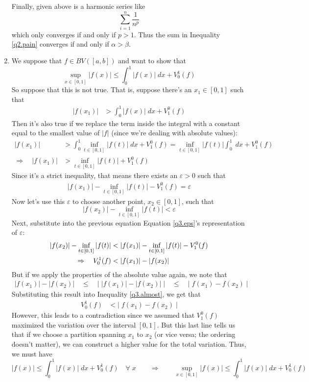 \documentclass[12pt]{article}
\theoremstyle{plain}
\theoremstyle{definition}
\theoremstyle{remark}
\begin{document}
\begin{enumerate}
Finally, given above is a harmonic series like
\[
    \sum^n_{i=1} \frac{1}{n^p}
\]
which only converges if and only if $p>1$. Thus the sum in Inequality \ref{q2.pain} converges if and only if $\alpha>\beta$.

\newpage
\item We suppose that $f\in BV([a,b])$ and want to show that
    \[ \sup_{x\in[0,1]} |f(x)| \leq \int^1_0 |f(x)|\;dx
        + V^1_0(f) \]
    So suppose that this is not true.  That is, suppose there's an $x_1\in[0,1]$ such that
\begin{align*}
    |f(x_1)| &> \int^1_0 |f(x)|\;dx + V_1^0(f)  
\end{align*}
Then it's also true if we replace the term inside the integral with a constant equal to the smallest value of $|f|$ (since we're dealing with absolute values):
\begin{align*}
    |f(x_1)| &> \int^1_0 \inf_{t\in[0,1]} |f(t)|\;dx + V_1^0(f)  
        = \inf_{t\in[0,1]} |f(t)| \int^1_0 \;dx + V_1^0(f)  \\
    \Rightarrow \quad
        |f(x_1)| &> 
        \inf_{t\in[0,1]} |f(t)| + V_1^0(f) 
\end{align*}
Since it's a strict inequality, that means there exists an $\varepsilon>0$ such that
\begin{align}
    \label{q3.eps}
    |f(x_1)|  - \inf_{t\in[0,1]} |f(t)| - V_1^0(f) = \varepsilon  
\end{align}
Now let's use this $\varepsilon$ to choose another point, $x_2\in[0,1]$, such that
\[ 
    |f(x_2)| - \inf_{t\in[0,1]} |f(t)|  < \varepsilon
\]
Next, substitute into the previous equation Equation \ref{q3.eps}'s representation of $\varepsilon$: 
\begin{align}
    |f(x_2)| - \inf_{t\in[0,1]} |f(t)| &< 
        |f(x_1)|  - \inf_{t\in[0,1]} |f(t)| - V_1^0(f) \notag \\
    \Rightarrow \quad
        V_0^1(f) &< |f(x_1)| - |f(x_2)| 
        \label{q3.almost}
\end{align}
But if we apply the properties of the absolute value again, we note that
\begin{align*}
    |f(x_1)| - |f(x_2)| \quad \leq \quad
        \left\lvert\; |f(x_1)| - |f(x_2)|\; \right\rvert 
        \quad\leq\quad 
        \left\lvert\; f(x_1) - f(x_2)\; \right\rvert 
\end{align*}
Substituting this result into Inequality \ref{q3.almost}, we get that
\begin{align}
        V_0^1(f) &<
        \left\lvert\; f(x_1) - f(x_2)\; \right\rvert 
\end{align}
However, this leads to a contradiction since we assumed that $V_1^0(f)$ maximized the variation over the interval $[0,1]$.  But this last line tells us that if we choose a partition spanning $x_1$ to $x_2$ (or vice versa; the ordering doesn't matter), we can construct a higher value for the total variation. Thus, we must have 
\[ 
    |f(x)| \leq \int^1_0 |f(x)|\;dx
    + V^1_0(f) \quad \forall\; x
    \qquad \Rightarrow \qquad
    \sup_{x\in[0,1]} |f(x)| \leq \int^1_0 |f(x)|\;dx
    + V^1_0(f) 
\]



\end{enumerate}
\end{document}
